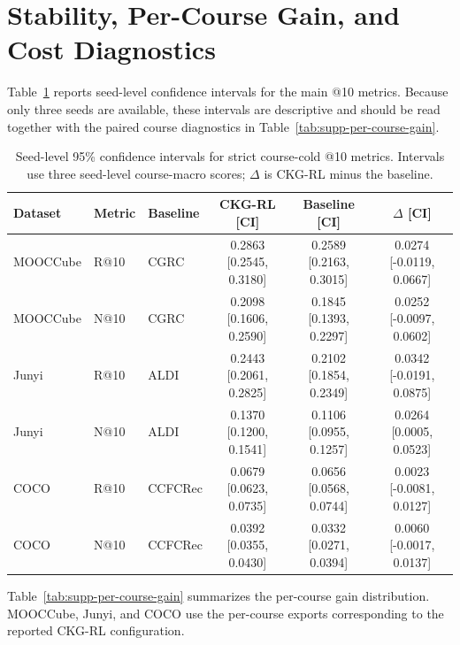 \section{Stability, Per-Course Gain, and Cost Diagnostics}

Table~\ref{tab:supp-seed-ci} reports seed-level confidence intervals for the main @10 metrics. Because only three seeds are available, these intervals are descriptive and should be read together with the paired course diagnostics in Table~\ref{tab:supp-per-course-gain}.

\begin{table}[t]
\centering
\caption{Seed-level 95\% confidence intervals for strict course-cold @10 metrics. Intervals use three seed-level course-macro scores; \(\Delta\) is CKG-RL minus the baseline.}
\label{tab:supp-seed-ci}
\tablecaptiongap
\small
\setlength{\tabcolsep}{3.8pt}
\begin{tabular*}{\textwidth}{@{\extracolsep{\fill}}lllccc}
\toprule
Dataset & Metric & Baseline & CKG-RL [CI] & Baseline [CI] & \(\Delta\) [CI] \\
\midrule
MOOCCube & R@10 & CGRC & 0.2863 [0.2545, 0.3180] & 0.2589 [0.2163, 0.3015] & 0.0274 [-0.0119, 0.0667] \\
MOOCCube & N@10 & CGRC & 0.2098 [0.1606, 0.2590] & 0.1845 [0.1393, 0.2297] & 0.0252 [-0.0097, 0.0602] \\
Junyi & R@10 & ALDI & 0.2443 [0.2061, 0.2825] & 0.2102 [0.1854, 0.2349] & 0.0342 [-0.0191, 0.0875] \\
Junyi & N@10 & ALDI & 0.1370 [0.1200, 0.1541] & 0.1106 [0.0955, 0.1257] & 0.0264 [0.0005, 0.0523] \\
COCO & R@10 & CCFCRec & 0.0679 [0.0623, 0.0735] & 0.0656 [0.0568, 0.0744] & 0.0023 [-0.0081, 0.0127] \\
COCO & N@10 & CCFCRec & 0.0392 [0.0355, 0.0430] & 0.0332 [0.0271, 0.0394] & 0.0060 [-0.0017, 0.0137] \\
\bottomrule
\end{tabular*}
\end{table}

Table~\ref{tab:supp-per-course-gain} summarizes the per-course gain distribution. MOOCCube, Junyi, and COCO use the per-course exports corresponding to the reported CKG-RL configuration.

